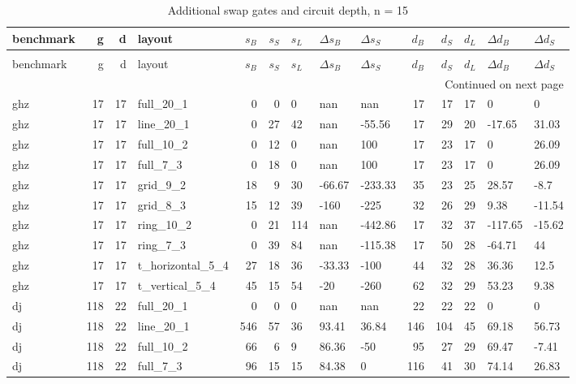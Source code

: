 \begin{longtable}{lrrlrrlllrrlll}
\caption{Additional swap gates and circuit depth, n = 15} \label{benchmark-table-15} \\
\toprule
benchmark & g & d & layout & $s_B$ & $s_S$ & $s_L$ & $\Delta s_B$ & $\Delta s_S$ & $d_B$ & $d_S$ & $d_L$ & $\Delta d_B$ & $\Delta d_S$ \\
\midrule
\endfirsthead
\caption[]{Additional swap gates and circuit depth, n = 15} \\
\toprule
benchmark & g & d & layout & $s_B$ & $s_S$ & $s_L$ & $\Delta s_B$ & $\Delta s_S$ & $d_B$ & $d_S$ & $d_L$ & $\Delta d_B$ & $\Delta d_S$ \\
\midrule
\endhead
\midrule
\multicolumn{14}{r}{Continued on next page} \\
\midrule
\endfoot
\bottomrule
\endlastfoot
ghz & 17 & 17 & full\_20\_1 & 0 & 0 & 0 & nan & nan & 17 & 17 & 17 & 0 & 0 \\
ghz & 17 & 17 & line\_20\_1 & 0 & 27 & 42 & nan & -55.56 & 17 & 29 & 20 & -17.65 & 31.03 \\
ghz & 17 & 17 & full\_10\_2 & 0 & 12 & 0 & nan & 100 & 17 & 23 & 17 & 0 & 26.09 \\
ghz & 17 & 17 & full\_7\_3 & 0 & 18 & 0 & nan & 100 & 17 & 23 & 17 & 0 & 26.09 \\
ghz & 17 & 17 & grid\_9\_2 & 18 & 9 & 30 & -66.67 & -233.33 & 35 & 23 & 25 & 28.57 & -8.7 \\
ghz & 17 & 17 & grid\_8\_3 & 15 & 12 & 39 & -160 & -225 & 32 & 26 & 29 & 9.38 & -11.54 \\
ghz & 17 & 17 & ring\_10\_2 & 0 & 21 & 114 & nan & -442.86 & 17 & 32 & 37 & -117.65 & -15.62 \\
ghz & 17 & 17 & ring\_7\_3 & 0 & 39 & 84 & nan & -115.38 & 17 & 50 & 28 & -64.71 & 44 \\
ghz & 17 & 17 & t\_horizontal\_5\_4 & 27 & 18 & 36 & -33.33 & -100 & 44 & 32 & 28 & 36.36 & 12.5 \\
ghz & 17 & 17 & t\_vertical\_5\_4 & 45 & 15 & 54 & -20 & -260 & 62 & 32 & 29 & 53.23 & 9.38 \\
dj & 118 & 22 & full\_20\_1 & 0 & 0 & 0 & nan & nan & 22 & 22 & 22 & 0 & 0 \\
dj & 118 & 22 & line\_20\_1 & 546 & 57 & 36 & 93.41 & 36.84 & 146 & 104 & 45 & 69.18 & 56.73 \\
dj & 118 & 22 & full\_10\_2 & 66 & 6 & 9 & 86.36 & -50 & 95 & 27 & 29 & 69.47 & -7.41 \\
dj & 118 & 22 & full\_7\_3 & 96 & 15 & 15 & 84.38 & 0 & 116 & 41 & 30 & 74.14 & 26.83 \\

\end{longtable}

